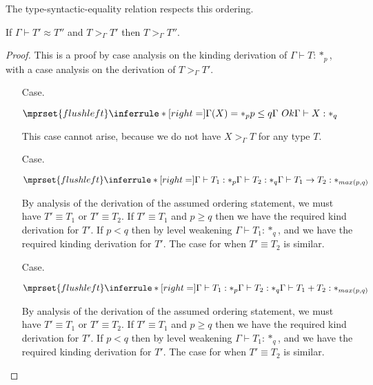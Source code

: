 \noindent
The type-syntactic-equality relation respects this ordering.
\begin{lemma}
  \label{lemma:typeq_ordering_ssfe}
  If $\Gamma \vdash T' \approx T''$ and $T >_{\Gamma} T'$ then $T >_\Gamma T''$.
\end{lemma}
\begin{proof}
  This is a proof by case analysis on the kinding derivation of 
$\Gamma \vdash T:*_p$, with a case analysis on the derivation of 
$T >_\Gamma T'$.\\

\begin{itemize}
\item[Case.]\ \\
  \begin{center}
    \begin{math}
      $$\mprset{flushleft}
      \inferrule* [right=] {
        \Gamma(X) = *_p
	\\
	p \leq q
	\\
	\Gamma\ Ok
      }{\Gamma \vdash X : *_q}
    \end{math}
  \end{center}
  This case cannot arise, because we do not have $X >_\Gamma T$ for any type 
  $T$.\\
  
\item[Case.]\ \\
  \begin{center}
    \begin{math}
      $$\mprset{flushleft}
      \inferrule* [right=] {
        \Gamma \vdash T_1 : *_p
	\\
	\Gamma \vdash T_2 : *_q
      }{\Gamma \vdash T_1 \rightarrow T_2 : *_{max(p,q)}}
    \end{math}
  \end{center}
  By analysis of the derivation of the assumed ordering statement, we must have 
  $T' \equiv T_1$ or $T' \equiv T_2$.  If $T' \equiv T_1$ and 
  $p \geq q$ then we have the required kind derivation for $T'$. If $p < q$ then by 
  level weakening $\Gamma \vdash T_1:*_q$, and we have the required kinding 
  derivation for $T'$.  The case for when $T' \equiv T_2$ is similar.\\
  
\item[Case.]\ \\
  \begin{center}
    \begin{math}
      $$\mprset{flushleft}
      \inferrule* [right=] {
        \Gamma \vdash T_1 : *_p
	\\
	\Gamma \vdash T_2 : *_q
      }{\Gamma \vdash T_1 + T_2 : *_{max(p,q)}}
    \end{math}
  \end{center}
  By analysis of the derivation of the assumed ordering statement, we must have 
  $T' \equiv T_1$ or $T' \equiv T_2$.  If $T' \equiv T_1$ and 
  $p \geq q$ then we have the required kind derivation for $T'$. If $p < q$ then by 
  level weakening $\Gamma \vdash T_1:*_q$, and we have the required kinding 
  derivation for $T'$.  The case for when $T' \equiv T_2$ is similar.\\
  

\end{itemize}
\end{proof}
